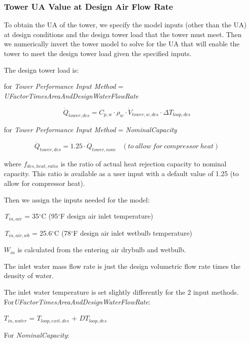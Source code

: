 \subsubsection{Tower UA Value at Design Air Flow Rate}\label{tower-ua-value-at-design-air-flow-rate}

To obtain the UA of the tower, we specify the model inputs (other than the UA) at design conditions and the design tower load that the tower must meet. Then we numerically invert the tower model to solve for the UA that will enable the tower to meet the design tower load given the specified inputs.

The design tower load is:

for \emph{Tower Performance Input Method} = \emph{UFactorTimesAreaAndDesignWaterFlowRate}

\begin{equation}
\dot Q_{tower,des} = C_{p,w} \cdot \rho_{w} \cdot \dot V_{tower,w,des} \cdot \Delta T_{loop,des}
\end{equation}

for \emph{Tower Performance Input Method} = \emph{NominalCapacity}

\begin{equation}
\dot Q_{tower,des} = 1.25 \cdot \dot Q_{tower,nom}~~~~(to~allow~for~compressor~heat)
\end{equation}

where \({f_{des,heat,ratio}}\) is the ratio of actual heat rejection capacity to nominal capacity. This ratio is available as a user input with a default value of 1.25 (to allow for compressor heat).

Then we assign the inputs needed for the model:

\emph{T\(_{in,air}\)} = 35\(^{\circ}\)C (95\(^{\circ}\)F design air inlet temperature)

\emph{T\(_{in,air,wb}\)} = 25.6\(^{\circ}\)C (78\(^{\circ}\)F design air inlet wetbulb temperature)

\(W_{in}\) is calculated from the entering air drybulb and wetbulb.

The inlet water mass flow rate is just the design volumetric flow rate times the density of water.

The inlet water temperature is set slightly differently for the 2 input methods. For\emph{UFactorTimesAreaAndDesignWaterFlowRate}:

\(T_{in,water}\) = \(T_{loop,exit,des}\) + \(DT_{loop,des}\)

For \emph{NominalCapacity}:

